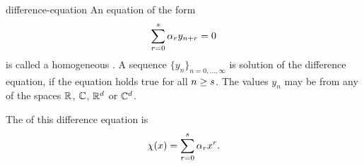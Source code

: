\begin{Definition}{difference-equation}
  An equation of the form
  \begin{gather}
    \label{eq:lmm:3}
    \sum_{r=0}^s \alpha_{r} y_{n+r} = 0
  \end{gather}
  is called a homogeneous . A sequence
  $\{y_n\}_{n=0,\dots,\infty}$ is solution of the difference equation,
  if the equation holds true for all $n\ge s$. The values
  $y_n$ may be from any of the spaces $\mathbb R$, $\mathbb C$, $\mathbb R^d$ or $\mathbb C^d$.

  The  of this difference equation
  is
  \begin{gather}
    \label{eq:lmm:2}
    \chi(x) = \sum_{r=0}^s \alpha_{r} x^{r}.
  \end{gather}

\end{Definition}

